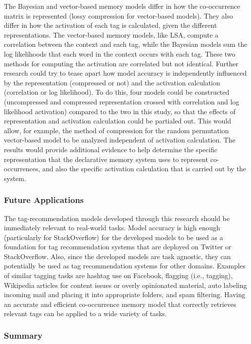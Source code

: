 \documentclass[man,floatsintext,donotrepeattitle]{apa6}
\begin{document}
The Bayesian and vector-based memory models differ in how the co-occurrence matrix is represented (lossy compression for vector-based models).
They also differ in how the activation of each tag is calculated, given the different representations.
The vector-based memory models, like LSA, compute a correlation between the context and each tag, while the Bayesian models sum the log likelihoods that each word in the context occurs with each tag.
These two methods for computing the activation are correlated but not identical.
Further research could try to tease apart how model accuracy is independently influenced by the representation (compressed or not) and the activation calculation (correlation or log likelihood).
To do this, four models could be constructed (uncompressed and compressed representation crossed with correlation and log likelihood activation) compared to the two in this study,
so that the effects of representation and activation calculation could be partialed out.
This would allow, for example, the method of compression for the random permutation vector-based model to be analyzed independent of activation calculation.
The results would provide additional evidence to help determine the specific representation that the declarative memory system uses to represent co-occurrences,
and also the specific activation calculation that is carried out by the system.

\subsubsection{Future Applications}

The tag-recommendation models developed through this research should be immediately relevant to real-world tasks.
Model accuracy is high enough (particularly for StackOverflow) for the developed models to be used as a foundation for tag recommendation systems that are deployed on Twitter or StackOverflow.
Also, since the developed models are task agnostic, they can potentially be used as tag recommendation systems for other domains.
Examples of similar tagging tasks are hashtag use on Facebook, flagging (i.e., tagging), Wikipedia articles for content issues or overly opinionated material,
auto labeling incoming mail and placing it into appropriate folders, and spam filtering.
Having an accurate and efficient co-occurrence memory model that correctly retrieves relevant tags can be applied to a wide variety of tasks.

\subsubsection{Summary}
\end{document}
